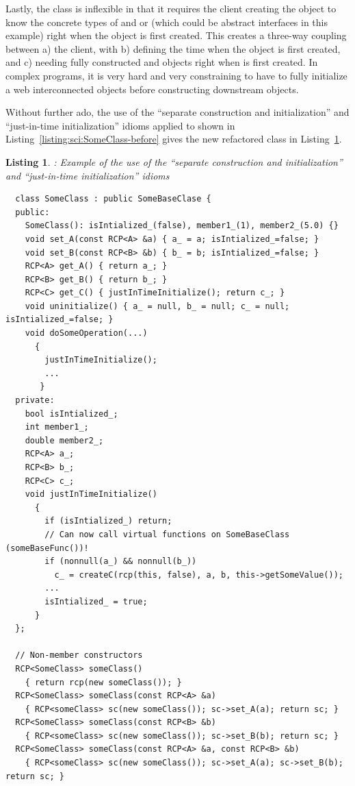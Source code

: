 \documentclass[pdf,ps2pdf,11pt]{SANDreport}
\newtheorem{listing}{Listing}
\begin{document}
Lastly, the class {} is inflexible in that it requires
the client creating the {} object to know the concrete
types of {} and or {} (which could be abstract
interfaces in this example) right when the {} object is
first created.  This creates a three-way coupling between a) the
client, with b) defining the time when the {} object is
first created, and c) needing fully constructed {} and
{} objects right when {} is first created.  In
complex programs, it is very hard and very constraining to have to
fully initialize a web interconnected objects before constructing
downstream objects.

Without further ado, the use of the ``separate construction and
initialization'' and ``just-in-time initialization'' idioms applied to
{} shown in Listing~\ref{listing:sci:SomeClass-before}
gives the new refactored class in
Listing~\ref{listing:sci:SomeClass-refactored}.


\begin{listing}: Example of the use of the ``separate construction and
initialization'' and ``just-in-time initialization'' idioms  \\
\label{listing:sci:SomeClass-refactored}
{\small\begin{verbatim}
  class SomeClass : public SomeBaseClase {
  public:
    SomeClass(): isIntialized_(false), member1_(1), member2_(5.0) {}
    void set_A(const RCP<A> &a) { a_ = a; isIntialized_=false; }
    void set_B(const RCP<B> &b) { b_ = b; isIntialized_=false; }
    RCP<A> get_A() { return a_; }
    RCP<B> get_B() { return b_; }
    RCP<C> get_C() { justInTimeInitialize(); return c_; }
    void uninitialize() { a_ = null, b_ = null; c_ = null; isIntialized_=false; }
    void doSomeOperation(...)
      {
        justInTimeInitialize();
        ...
       }
  private:
    bool isIntialized_;
    int member1_;
    double member2_;
    RCP<A> a_;
    RCP<B> b_;
    RCP<C> c_;
    void justInTimeInitialize()
      {
        if (isIntialized_) return;
        // Can now call virtual functions on SomeBaseClass (someBaseFunc())!
        if (nonnull(a_) && nonnull(b_))
          c_ = createC(rcp(this, false), a, b, this->getSomeValue());
        ...
        isIntialized_ = true;
      }
  };

  // Non-member constructors
  RCP<SomeClass> someClass()
    { return rcp(new someClass()); }
  RCP<SomeClass> someClass(const RCP<A> &a)
    { RCP<someClass> sc(new someClass()); sc->set_A(a); return sc; }
  RCP<SomeClass> someClass(const RCP<B> &b)
    { RCP<someClass> sc(new someClass()); sc->set_B(b); return sc; }
  RCP<SomeClass> someClass(const RCP<A> &a, const RCP<B> &b)
    { RCP<someClass> sc(new someClass()); sc->set_A(a); sc->set_B(b);  return sc; }
\end{verbatim}}
\end{listing}
\end{document}
